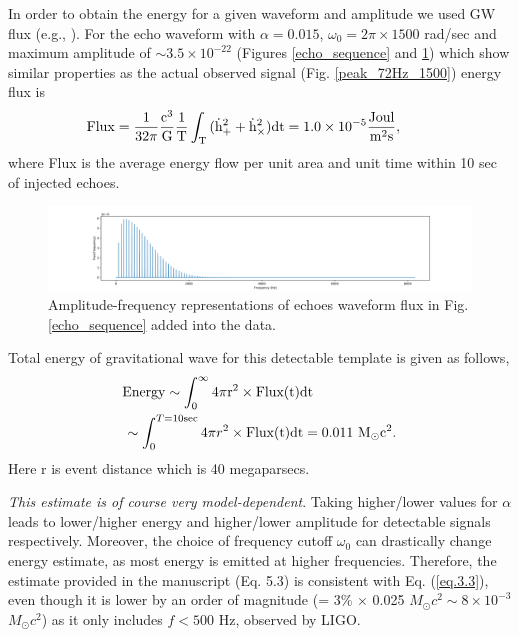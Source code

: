 \documentclass[a4paper,11pt]{article}
\begin{document}
In order to obtain the energy for a given waveform and amplitude we used GW flux (e.g., \cite{Hobson,GravitationalWavePhysics}). For the echo waveform with $\alpha=0.015$, $\omega_{0}=2\pi\times 1500$ rad/sec and maximum amplitude of $\sim 3.5\times 10^{-22}$  (Figures \ref{echo_sequence} and \ref{Flux}) which show similar properties as the actual observed signal (Fig. \ref{peak_72Hz_1500}) energy flux is
\begin{eqnarray}
\!\!\!\!\!\!\!\!\!\!\!\!\!\!\rm{Flux}=\frac{1}{32\pi} \frac{c^{3}}{G} \frac{1}{T} \int_{T}{(\dot{h}_{+}^{2} + \dot{h}_{\times}^{2}})dt=1.0 \times 10^{-5} \frac{\rm{Joul}}{\rm{m}^{2}\rm{s}} \label{eq.3.2}, \nonumber \\
\end{eqnarray}
where Flux is the average energy flow per unit area and unit time within 10 sec of injected echoes. 
\begin{figure}[t]
    \includegraphics[width=1\textwidth]{Flux_in_frequency01.pdf}
 \caption{Amplitude-frequency representations of echoes waveform flux in Fig. \ref{echo_sequence} added into the data.}
 \label{Flux}
\end{figure}

Total energy of gravitational wave for this detectable template is given as follows,
\begin{eqnarray}
\rm{Energy} \sim \int_{0}^{\infty} 4\pi r^{2} \times \rm{Flux(t)} dt \ \ \ \ \ \ \ \ \ \ \ \ \ \ \ \ \ \ \nonumber \\
\!\!\!\!\! \sim \int_{0}^{T=10 \rm{sec}} 4\pi r^{2} \times \rm{Flux(t)} dt =0.011 ~M_{\odot}c^2. \label{eq.3.3}
\end{eqnarray}
Here r is event distance which is 40 megaparsecs. 

{\it This estimate is of course very model-dependent}. Taking higher/lower values for $\alpha$ leads to lower/higher energy and higher/lower amplitude for detectable signals respectively. Moreover, the choice of frequency cutoff $\omega_0$ can drastically change energy estimate, as most energy is emitted at higher frequencies. Therefore, the estimate provided in the manuscript (Eq. 5.3)  is consistent with Eq. (\ref{eq.3.3}), even though it is lower by an order of magnitude (= 3\% $\times$ 0.025 $M_{\odot}c^2 \sim 8 \times 10^{-3}$  $M_{\odot}c^2$) as it only includes $f < 500$ Hz, observed by LIGO. 
\end{document}
